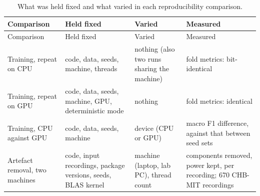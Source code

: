 \documentclass[11pt,a4paper]{article}
\begin{document}
\begin{longtable}[]{@{}
  >{\raggedright\arraybackslash}p{}
  >{\raggedright\arraybackslash}p{}
  >{\raggedright\arraybackslash}p{}
  >{\raggedright\arraybackslash}p{}@{}}
\caption{What was held fixed and what varied in each reproducibility comparison.}\tabularnewline
\toprule\noalign{}
\begin{minipage}[b]{\linewidth}\raggedright
Comparison
\end{minipage} & \begin{minipage}[b]{\linewidth}\raggedright
Held fixed
\end{minipage} & \begin{minipage}[b]{\linewidth}\raggedright
Varied
\end{minipage} & \begin{minipage}[b]{\linewidth}\raggedright
Measured
\end{minipage} \\
\midrule\noalign{}
\endfirsthead
\toprule\noalign{}
\begin{minipage}[b]{\linewidth}\raggedright
Comparison
\end{minipage} & \begin{minipage}[b]{\linewidth}\raggedright
Held fixed
\end{minipage} & \begin{minipage}[b]{\linewidth}\raggedright
Varied
\end{minipage} & \begin{minipage}[b]{\linewidth}\raggedright
Measured
\end{minipage} \\
\midrule\noalign{}
\endhead
\bottomrule\noalign{}
\endlastfoot
Training, repeat on CPU & code, data, seeds, machine, threads & nothing (also two runs sharing the machine) & fold metrics: bit-identical \\
Training, repeat on GPU & code, data, seeds, machine, GPU, deterministic mode & nothing & fold metrics: identical \\
Training, CPU against GPU & code, data, seeds, machine & device (CPU or GPU) & macro F1 difference, against that between seed sets \\
Artefact removal, two machines & code, input recordings, package versions, seeds, BLAS kernel & machine (laptop, lab PC), thread count & components removed, power kept, per recording; 670 CHB-MIT recordings \\

\end{longtable}
\end{document}
